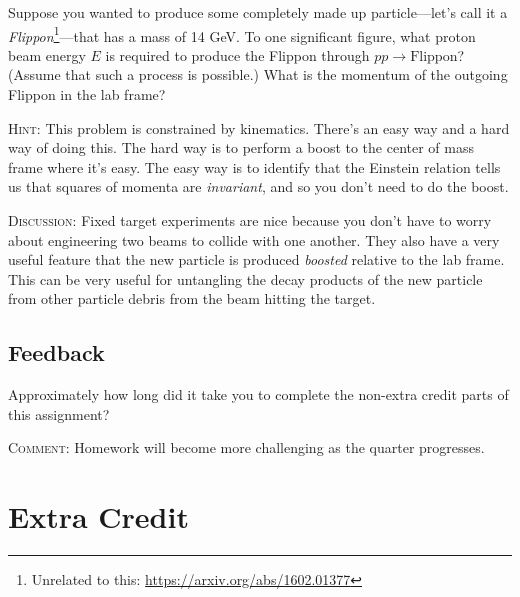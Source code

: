 \documentclass[12pt]{article}
\numberwithin{equation}{section}    %
\begin{document}
Suppose you wanted to produce some completely made up particle---let's call it a \emph{Flippon}\footnote{Unrelated to this: \url{https://arxiv.org/abs/1602.01377}}---that has a mass of 14 GeV. To one significant figure, what proton beam energy $E$ is required to produce the Flippon through $pp \to \text{Flippon}$? (Assume that such a process is possible.) What is the momentum of the outgoing Flippon in the lab frame?

\textsc{Hint}: This problem is constrained by kinematics. There's an easy way and a hard way of doing this. The hard way is to perform a boost to the center of mass frame where it's easy. The easy way is to identify that the Einstein relation tells us that squares of momenta are \emph{invariant}, and so you don't need to do the boost. 

\textsc{Discussion}: Fixed target experiments are nice because you don't have to worry about engineering two beams to collide with one another. They also have a very useful feature that the new particle is produced \emph{boosted} relative to the lab frame. This can be very useful for untangling the decay products of the new particle from other  particle debris from the beam hitting the target.


%
%





\subsection{Feedback}

Approximately how long did it take you to complete the non-extra credit parts of this assignment?

\textsc{Comment}: Homework will become more challenging as the quarter progresses.



\section{Extra Credit}
\end{document}

